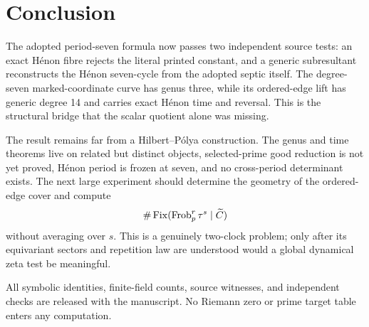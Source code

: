 \section{Conclusion}

The adopted period-seven formula now passes two independent source tests: an
exact H\'enon fibre rejects the literal printed constant, and a generic
subresultant reconstructs the H\'enon seven-cycle from the adopted septic
itself.  The degree-seven marked-coordinate curve has genus three, while its
ordered-edge lift has generic degree 14 and carries exact H\'enon time and
reversal.  This is the structural bridge that the scalar quotient alone was
missing.

The result remains far from a Hilbert--P\'olya construction.  The genus and
time theorems live on related but distinct objects, selected-prime good
reduction is not yet proved, H\'enon period is frozen at seven, and no
cross-period determinant exists.  The next large experiment should determine
the geometry of the ordered-edge cover and compute
\[
\#\operatorname{Fix}(\operatorname{Frob}_p^r\tau^s\mid\widetilde C)
\]
without averaging over $s$.  This is a genuinely two-clock problem; only
after its equivariant sectors and repetition law are understood would a
global dynamical zeta test be meaningful.

All symbolic identities, finite-field counts, source witnesses, and
independent checks are released with the manuscript.  No Riemann zero or
prime target table enters any computation.
